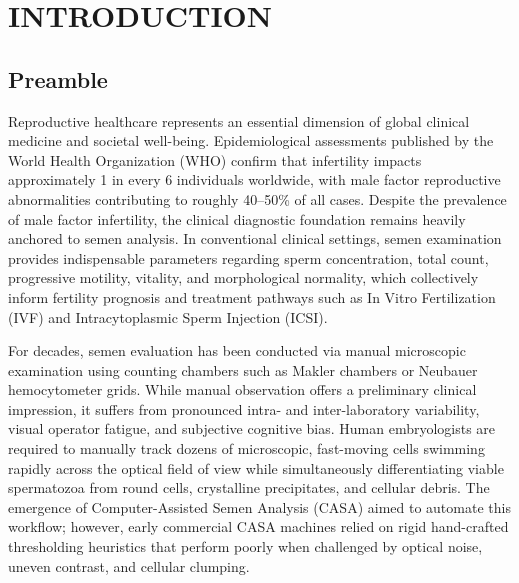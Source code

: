 \documentclass[12pt,a4paper]{report}
\begin{document}
\newpage
\tableofcontents

\newpage
\listoffigures

\newpage
\listoftables

\newpage
{}
\setcounter{page}{1}

\chapter{INTRODUCTION}

\section{Preamble}
Reproductive healthcare represents an essential dimension of global clinical medicine and societal well-being. Epidemiological assessments published by the World Health Organization (WHO) confirm that infertility impacts approximately 1 in every 6 individuals worldwide, with male factor reproductive abnormalities contributing to roughly 40--50\% of all cases. Despite the prevalence of male factor infertility, the clinical diagnostic foundation remains heavily anchored to semen analysis. In conventional clinical settings, semen examination provides indispensable parameters regarding sperm concentration, total count, progressive motility, vitality, and morphological normality, which collectively inform fertility prognosis and treatment pathways such as In Vitro Fertilization (IVF) and Intracytoplasmic Sperm Injection (ICSI).

For decades, semen evaluation has been conducted via manual microscopic examination using counting chambers such as Makler chambers or Neubauer hemocytometer grids. While manual observation offers a preliminary clinical impression, it suffers from pronounced intra- and inter-laboratory variability, visual operator fatigue, and subjective cognitive bias. Human embryologists are required to manually track dozens of microscopic, fast-moving cells swimming rapidly across the optical field of view while simultaneously differentiating viable spermatozoa from round cells, crystalline precipitates, and cellular debris. The emergence of Computer-Assisted Semen Analysis (CASA) aimed to automate this workflow; however, early commercial CASA machines relied on rigid hand-crafted thresholding heuristics that perform poorly when challenged by optical noise, uneven contrast, and cellular clumping.
\end{document}
